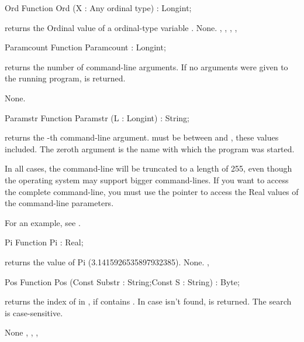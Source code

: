 \documentclass{report}
\begin{document}
\html{}
\begin{function}{Ord}
\Declaration
Function Ord (X : Any ordinal type) : Longint;

\Description
{} returns the Ordinal value of a ordinal-type variable .
\Errors
None.
\SeeAlso
{}, , , , 
\end{function}
\html{}
\begin{function}{Paramcount}
\Declaration
Function Paramcount  : Longint;

\Description
{} returns the number of command-line arguments. If no
arguments were given to the running program,  is returned.

\Errors
None.
\SeeAlso
{}
\end{function}
\html{}
\begin{function}{Paramstr}
\Declaration
Function Paramstr (L : Longint) : String;

\Description
{} returns the -th command-line argument.  must
be between  and , these values included.
The zeroth argument is the name with which the program was started.

\Errors
 In all cases, the command-line will be truncated to a length of 255,
even though the operating system may support bigger command-lines. If you
want to access the complete command-line, you must use the  pointer
to access the Real values of the command-line parameters.
\SeeAlso
{}
\end{function}
For an example, see .
\begin{function}{Pi}
\Declaration
Function Pi  : Real;

\Description
{} returns the value of Pi (3.1415926535897932385).
\Errors
None.
\SeeAlso
{}, 
\end{function}
\html{}
\begin{function}{Pos}
\Declaration
Function Pos (Const Substr : String;Const S : String) : Byte;

\Description
{} returns the index of  in , if  contains
. In case  isn't found,  is returned.
The search is case-sensitive.

\Errors
None
\SeeAlso
{}, , , 
\end{function}
\end{document}
